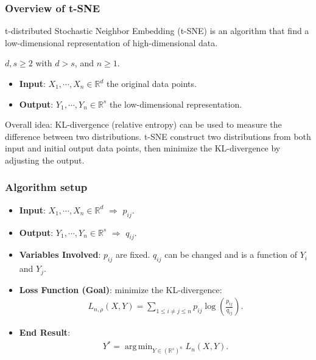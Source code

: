 \documentclass{beamer}
\DeclareMathOperator*{\argmin}{arg\,min}
\begin{document}
\begin{frame}
  \frametitle{Overview of t-SNE}
  t-distributed Stochastic Neighbor Embedding (t-SNE) is an algorithm that find a low-dimensional representation of high-dimensional data.

  \vspace{1em}
  $d,s \geq 2$ with $d>s$, and $n \geq 1$.
  \begin{itemize}
    \item[$\bullet$] \textbf{Input}: $X_1, \cdots, X_n \in \mathbb{R}^d$ the original data points.
    \item[$\bullet$] \textbf{Output}: $Y_1, \cdots, Y_n \in \mathbb{R}^s$ the low-dimensional representation.
  \end{itemize}

  \vspace{1em}
  Overall idea: KL-divergence (relative entropy) can be used to measure the difference between two distributions. t-SNE construct two distributions from both input and initial output data points, then minimize the KL-divergence by adjusting the output.
\end{frame}

\begin{frame}
  \frametitle{Algorithm setup}
  \begin{itemize}
    \item [$\bullet$] \textbf{Input}: $X_1, \cdots, X_n \in \mathbb{R}^d$ $\Longrightarrow$ $p_{ij}$.
    \item [$\bullet$] \textbf{Output}: $Y_1, \cdots, Y_n \in \mathbb{R}^s$ $\Longrightarrow$ $q_{ij}$.
    \item [$\bullet$] \textbf{Variables Involved}: $p_{ij}$ are fixed. $q_{ij}$ can be changed and is a function of $Y_i$ and $Y_j$.
    \item [$\bullet$] \textbf{Loss Function (Goal)}: minimize the KL-divergence:
          \begin{align}
            L_{n,\rho}(X,Y) = \sum_{1 \leq i \neq j \leq n} p_{ij} \log \left(\frac{p_{ij}}{q_{ij}}\right).
          \end{align}
    \item [$\bullet$] \textbf{End Result}:
          \begin{align}
            Y^* = \argmin_{Y \in (\mathbb{R}^s)^n}L_n(X,Y).
          \end{align}
  \end{itemize}
\end{frame}
\end{document}
